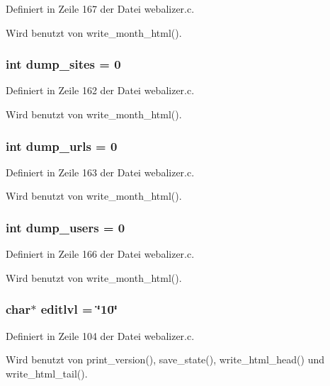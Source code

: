 Definiert in Zeile 167 der Datei webalizer.c.

Wird benutzt von write\_\-month\_\-html().
\subsubsection{\setlength{\rightskip}{0pt plus 5cm}int {\bf dump\_\-sites} = 0}\label{webalizer_8c_54401b9d6a97a9951e2fb1bf09e83b2b}




Definiert in Zeile 162 der Datei webalizer.c.

Wird benutzt von write\_\-month\_\-html().
\subsubsection{\setlength{\rightskip}{0pt plus 5cm}int {\bf dump\_\-urls} = 0}\label{webalizer_8c_a9f638a5b7e03638423ce8d5c3f5be6e}




Definiert in Zeile 163 der Datei webalizer.c.

Wird benutzt von write\_\-month\_\-html().
\subsubsection{\setlength{\rightskip}{0pt plus 5cm}int {\bf dump\_\-users} = 0}\label{webalizer_8c_a6b267f406cddbd150680fb2ce5260b1}




Definiert in Zeile 166 der Datei webalizer.c.

Wird benutzt von write\_\-month\_\-html().
\subsubsection{\setlength{\rightskip}{0pt plus 5cm}char$\ast$ {\bf editlvl} = \char`\"{}10\char`\"{}}\label{webalizer_8c_59179d90a91f573f3c081592845ee19c}




Definiert in Zeile 104 der Datei webalizer.c.

Wird benutzt von print\_\-version(), save\_\-state(), write\_\-html\_\-head() und write\_\-html\_\-tail().
